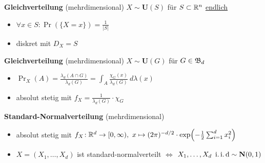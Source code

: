 \textbf{Gleichverteilung} (mehrdimensional) $X\sim\mathbf{U}(S)$ für $S\subset\mathbb{R}^n$
\underline{endlich}
\begin{itemize}
\item $\forall x\in S\!: \Pr(\{X=x\}) = \frac{1}{|S|}$

\item diskret mit $D_X = S$
\end{itemize}

\textbf{Gleichverteilung} (mehrdimensional) $X\sim\mathbf{U}(G)$ für $G\in\mathfrak{B}_d$
\begin{itemize}
\item $\Pr_X(A) = \frac{\lambda_d(A\cap G)}{\lambda_d(G)} =
  \int_A \frac{\chi_G(x)}{\lambda_d(G)}~d\lambda(x)$

\item absolut stetig mit $f_X = \frac{1}{\lambda_d(G)} \cdot \chi_G$
\end{itemize}

\textbf{Standard-Normalverteilung} (mehrdimensional)
\begin{itemize}
\item absolut stetig mit
  $f_X\!: \R^d \to [0,\infty),\
  x \mapsto (2\pi)^{-d/2} \cdot \exp\left(-\frac{1}{2} \sum_{i=1}^{d}x_i^2\right)$

\item $X = (X_1,\ldots,X_d)$ ist standard-normalverteilt
  $\Leftrightarrow$ $X_1,\ldots,X_d\ \operatorname{i.i.d} \sim\mathbf{N}(0,1)$
\end{itemize}
